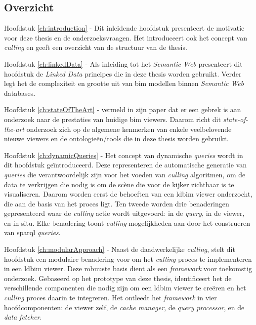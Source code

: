 \begin{refsection}
\begin{multicols}{2}
        \subsection*{Overzicht}
        \textsf{Hoofdstuk \ref{ch:introduction} -}
        Dit inleidende hoofdstuk presenteert de motivatie voor deze thesis en de onderzoeksvraagen. Het introduceert ook het concept van \emph{culling} en geeft een overzicht van de structuur van de thesis.

        \textsf{Hoofdstuk \ref{ch:linkedData} -}
        Als inleiding tot het \emph{Semantic Web} presenteert dit hoofdstuk de \emph{Linked Data} principes die in deze thesis worden gebruikt. Verder legt het de complexiteit en grootte uit van \ac{bim} modellen binnen \emph{Semantic Web} databases.

        \textsf{Hoofdstuk \ref{ch:stateOfTheArt} -}
        \cite{Johansson2015} vermeld in zijn paper dat er een gebrek is aan onderzoek naar de prestaties van huidige \ac{bim} viewers. Daarom richt dit \emph{state-of-the-art} onderzoek zich op de algemene kenmerken van enkele veelbelovende nieuwe viewers en de ontologieën/tools die in deze thesis worden gebruikt.

        \textsf{Hoofdstuk \ref{ch:dynamicQueries} -}
        Het concept van dynamische \emph{queries} wordt in dit hoofdstuk geïntroduceerd. Deze representeren de automatische generatie van \emph{queries} die verantwoordelijk zijn voor het voeden van \emph{culling} algoritmen, om de data te verkrijgen die nodig is om de scène die voor de kijker zichtbaar is te visualiseren. Daarom worden eerst de behoeften van een \ac{ldbim} viewer onderzocht, die aan de basis van het proces ligt. Ten tweede worden drie benaderingen gepresenteerd waar de \emph{culling} actie wordt uitgevoerd: in de \emph{query}, in de viewer, en in situ. Elke benadering toont \emph{culling} mogelijkheden aan door het construeren van \ac{sparql} \emph{queries}.

        \textsf{Hoofdstuk \ref{ch:modularApproach} -}
        Naast de daadwerkelijke \emph{culling}, stelt dit hoofdstuk een modulaire benadering voor om het \emph{culling} proces te implementeren in een \ac{ldbim} viewer. Deze robuuste basis dient als een \emph{framework} voor toekomstig onderzoek. Gebaseerd op het prototype van deze thesis, identificeert het de verschillende componenten die nodig zijn om een \ac{ldbim} viewer te creëren en het \emph{culling} proces daarin te integreren. Het ontleedt het \emph{framework} in vier hoofdcomponenten: de viewer zelf, de \emph{cache manager}, de \emph{query processor}, en de \emph{data fetcher}.


\end{multicols}
\end{refsection}
